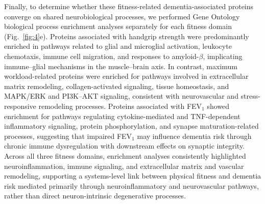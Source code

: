 \documentclass{article}
\begin{document}
Finally, to determine whether these fitness-related dementia-associated proteins converge on shared neurobiological processes, we performed Gene Ontology biological process enrichment analyses separately for each fitness domain (Fig.~\ref{fig:4}e). Proteins associated with handgrip strength were predominantly enriched in pathways related to glial and microglial activation, leukocyte chemotaxis, immune cell migration, and responses to amyloid-$\beta$, implicating immune–glial mechanisms in the muscle–brain axis. In contrast, maximum workload-related proteins were enriched for pathways involved in extracellular matrix remodeling, collagen-activated signaling, tissue homeostasis, and MAPK/ERK and PI3K--AKT signaling, consistent with neurovascular and stress-responsive remodeling processes. Proteins associated with FEV$_1$ showed enrichment for pathways regulating cytokine-mediated and TNF-dependent inflammatory signaling, protein phosphorylation, and synapse maturation-related processes, suggesting that impaired FEV$_1$ may influence dementia risk through chronic immune dysregulation with downstream effects on synaptic integrity. Across all three fitness domains, enrichment analyses consistently highlighted neuroinflammation, immune signaling, and extracellular matrix and vascular remodeling, supporting a systems-level link between physical fitness and dementia risk mediated primarily through neuroinflammatory and neurovascular pathways, rather than direct neuron-intrinsic degenerative processes.
\end{document}
